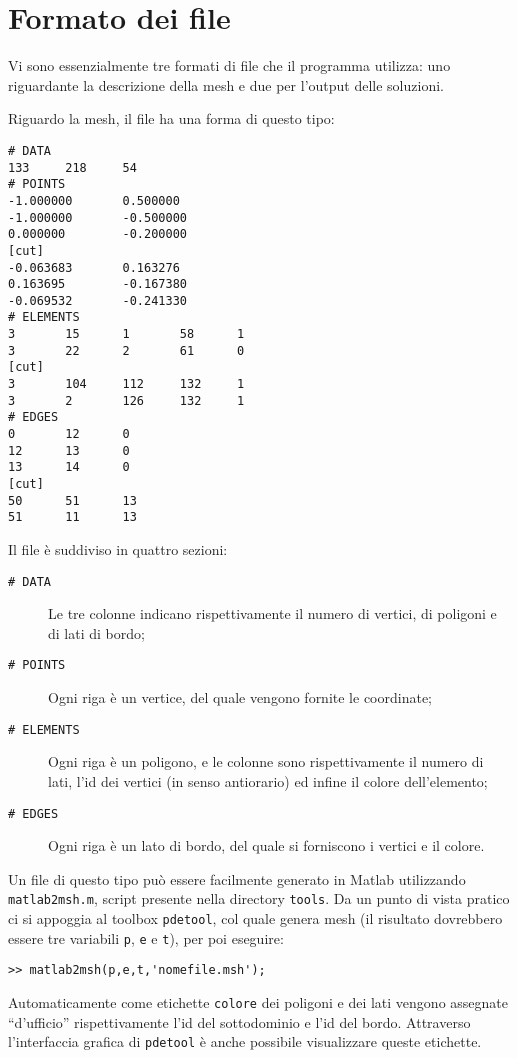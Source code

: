 \section{Formato dei file}
Vi sono essenzialmente tre formati di file che il programma utilizza: uno riguardante la descrizione della mesh e due per l'output delle soluzioni.

Riguardo la mesh, il file ha una forma di questo tipo:
\begin{verbatim}
# DATA
133     218     54
# POINTS
-1.000000       0.500000
-1.000000       -0.500000
0.000000        -0.200000
[cut]
-0.063683       0.163276
0.163695        -0.167380
-0.069532       -0.241330
# ELEMENTS
3       15      1       58      1
3       22      2       61      0
[cut]
3       104     112     132     1
3       2       126     132     1
# EDGES
0       12      0
12      13      0
13      14      0
[cut]
50      51      13
51      11      13
\end{verbatim}
Il file è suddiviso in quattro sezioni:
\begin{description}
\item[\texttt{\# DATA}] Le tre colonne indicano rispettivamente il numero di vertici, di poligoni e di lati di bordo;
\item[\texttt{\# POINTS}] Ogni riga è un vertice, del quale vengono fornite le coordinate;
\item[\texttt{\# ELEMENTS}] Ogni riga è un poligono, e le colonne sono rispettivamente il numero di lati, l'id dei vertici (in senso antiorario) ed infine il colore dell'elemento;
\item[\texttt{\# EDGES}] Ogni riga è un lato di bordo, del quale si forniscono i vertici e il colore.
\end{description}

Un file di questo tipo può essere facilmente generato in Matlab utilizzando \texttt{matlab2msh.m}, script presente nella directory \texttt{tools}. Da un punto di vista pratico ci si appoggia al toolbox \texttt{pdetool}, col quale genera mesh (il risultato dovrebbero essere tre variabili \texttt{p}, \texttt{e} e \texttt{t}), per poi eseguire:
\begin{verbatim}
>> matlab2msh(p,e,t,'nomefile.msh');
\end{verbatim}
Automaticamente come etichette \texttt{colore} dei poligoni e dei lati vengono assegnate ``d'ufficio'' rispettivamente l'id del sottodominio e l'id del bordo. Attraverso l'interfaccia grafica di \texttt{pdetool} è anche possibile visualizzare queste etichette.

